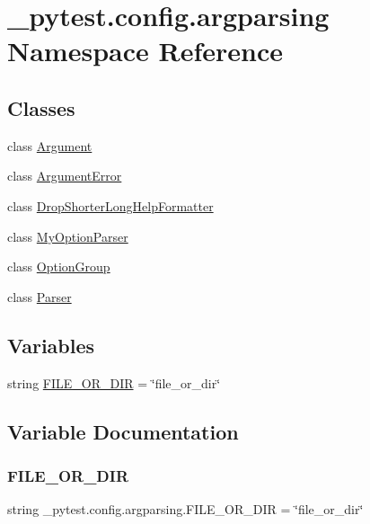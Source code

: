 \hypertarget{namespace__pytest_1_1config_1_1argparsing}{}\section{\+\_\+pytest.\+config.\+argparsing Namespace Reference}
\label{namespace__pytest_1_1config_1_1argparsing}
\subsection*{Classes}
\begin{DoxyCompactItemize}
\item 
class \hyperlink{class__pytest_1_1config_1_1argparsing_1_1_argument}{Argument}
\item 
class \hyperlink{class__pytest_1_1config_1_1argparsing_1_1_argument_error}{Argument\+Error}
\item 
class \hyperlink{class__pytest_1_1config_1_1argparsing_1_1_drop_shorter_long_help_formatter}{Drop\+Shorter\+Long\+Help\+Formatter}
\item 
class \hyperlink{class__pytest_1_1config_1_1argparsing_1_1_my_option_parser}{My\+Option\+Parser}
\item 
class \hyperlink{class__pytest_1_1config_1_1argparsing_1_1_option_group}{Option\+Group}
\item 
class \hyperlink{class__pytest_1_1config_1_1argparsing_1_1_parser}{Parser}
\end{DoxyCompactItemize}
\subsection*{Variables}
\begin{DoxyCompactItemize}
\item 
string \hyperlink{namespace__pytest_1_1config_1_1argparsing_aa52e0263ca5884ac7121d1d6443594c7}{F\+I\+L\+E\+\_\+\+O\+R\+\_\+\+D\+IR} = \char`\"{}file\+\_\+or\+\_\+dir\char`\"{}
\end{DoxyCompactItemize}


\subsection{Variable Documentation}
\mbox{\label{namespace__pytest_1_1config_1_1argparsing_aa52e0263ca5884ac7121d1d6443594c7}} 
\subsubsection{\texorpdfstring{F\+I\+L\+E\+\_\+\+O\+R\+\_\+\+D\+IR}{FILE\_OR\_DIR}}
{\footnotesize\ttfamily string \+\_\+pytest.\+config.\+argparsing.\+F\+I\+L\+E\+\_\+\+O\+R\+\_\+\+D\+IR = \char`\"{}file\+\_\+or\+\_\+dir\char`\"{}}

